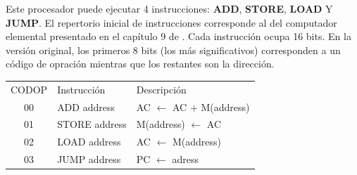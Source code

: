 Este procesador puede ejecutar 4 instrucciones: \textbf{ADD}, \textbf{STORE}, \textbf{LOAD} Y \textbf{JUMP}. El repertorio 
inicial de instrucciones corresponde al del computador elemental presentado en el capítulo 9 de \cite{hamblen2007rapid}. Cada 
instrucción ocupa 16 bits. En la versión original, los primeros 8 bits (los más significativos) corresponden a un código de 
opración mientras que los restantes son la dirección.

\begin{tabular}{c l l}
    CODOP & Instrucción & Descripción \\
    00 & ADD address & AC $\leftarrow$ AC $+$ M(address) \\
    01 & STORE address & M(address) $\leftarrow$ AC \\
    02 & LOAD address &  AC $\leftarrow$ M(address) \\
    03 & JUMP address &  PC $\leftarrow$ adress\\
\end{tabular}


